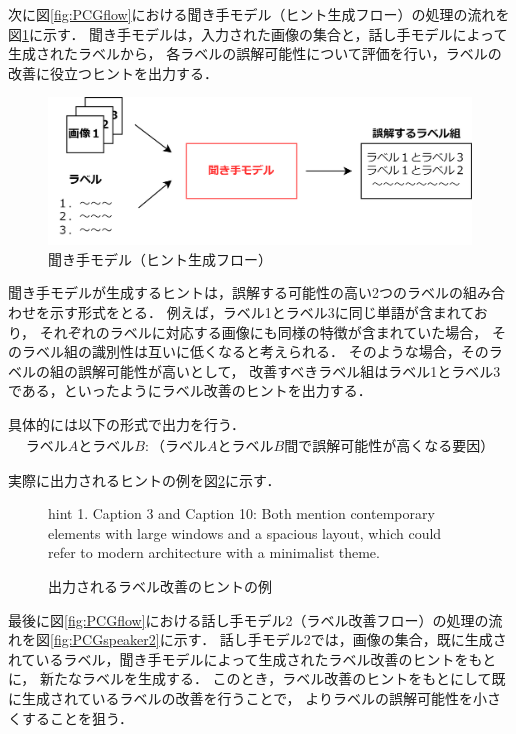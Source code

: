 \documentclass[a4paper,11pt]{jreport}
\begin{document}
次に図\ref{fig:PCGflow}における聞き手モデル（ヒント生成フロー）の処理の流れを図\ref{fig:PCGlistener}に示す．
聞き手モデルは，入力された画像の集合と，話し手モデルによって生成されたラベルから，
各ラベルの誤解可能性について評価を行い，ラベルの改善に役立つヒントを出力する．

\begin{figure}[H]
	\centering
	\includegraphics[width=0.8\linewidth]{figures/PCGlistener.png}
	\caption{聞き手モデル（ヒント生成フロー）}
	\label{fig:PCGlistener}
\end{figure}

聞き手モデルが生成するヒントは，誤解する可能性の高い2つのラベルの組み合わせを示す形式をとる．
例えば，ラベル1とラベル3に同じ単語が含まれており，
それぞれのラベルに対応する画像にも同様の特徴が含まれていた場合，
そのラベル組の識別性は互いに低くなると考えられる．
そのような場合，そのラベルの組の誤解可能性が高いとして，
改善すべきラベル組はラベル1とラベル3である，といったようにラベル改善のヒントを出力する．

具体的には以下の形式で出力を行う．
\begin{eqnarray}
  ラベルAとラベルB:（ラベルAとラベルB間で誤解可能性が高くなる要因）  
\end{eqnarray}

実際に出力されるヒントの例を図\ref{fig:hint_example}に示す．

\begin{figure}[H]
  \begin{mdframed}[linewidth=1pt]
    hint 1. Caption 3 and Caption 10: Both mention contemporary elements with large windows and a spacious layout, which could refer to modern architecture with a minimalist theme.
  \end{mdframed}
  \caption{出力されるラベル改善のヒントの例}
  \label{fig:hint_example}
\end{figure}

最後に図\ref{fig:PCGflow}における話し手モデル2（ラベル改善フロー）の処理の流れを図\ref{fig:PCGspeaker2}に示す．
話し手モデル2では，画像の集合，既に生成されているラベル，聞き手モデルによって生成されたラベル改善のヒントをもとに，
新たなラベルを生成する．
このとき，ラベル改善のヒントをもとにして既に生成されているラベルの改善を行うことで，
よりラベルの誤解可能性を小さくすることを狙う．
\end{document}
